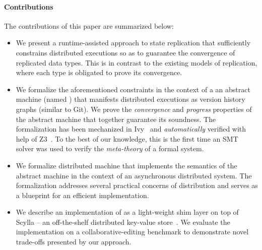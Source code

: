 
\paragraph{Contributions} The contributions of this paper are summarized
below:
\begin{itemize}
  \item We present a runtime-assisted approach to state replication
    that sufficiently constrains distributed executions so as to
    guarantee the convergence of replicated data types. This is in
    contrast to the existing models of replication, where each type is
    obligated to prove its convergence.

  \item We formalize the aforementioned constraints in the context of
    a an abstract machine (named \quark) that manifests distributed
    executions as version history graphs (similar to Git).
    We prove the \emph{convergence} and \emph{progress} properties of
    the \quark abstract machine that together guarantee its soundness.
    The formalization has been mechanized in Ivy~\cite{ivy} and
    \emph{automatically} verified with help of Z3~\cite{z3}. To the
    best of our knowledge, this is the first time an SMT solver was
    used to verify the \emph{meta-theory} of a formal system.

  \item We formalize \quark distributed machine that implements the
    semantics of the \quark abstract machine in the context of an
    asynchronous distributed system. The formalization addresses
    several practical concerns of distribution and serves as a
    blueprint for an efficient implementation.

  \item We describe an implementation of \quark as a light-weight shim
    layer on top of Scylla -- an off-the-shelf distributed key-value
    store~\cite{scylla}. We evaluate the implementation on a
    collaborative-editing benchmark to demonstrate novel trade-offs
    presented by our approach.
\end{itemize}

